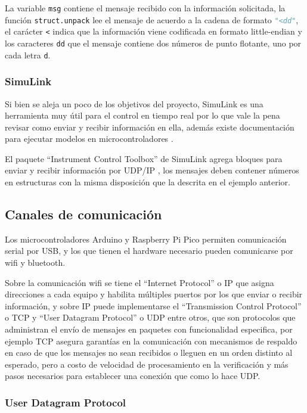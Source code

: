 La variable \lstinline{msg} contiene el mensaje recibido con la información solicitada, la función \lstinline{struct.unpack} lee el mensaje de acuerdo a la cadena de formato \lstinline[language=Python]{"<dd"}, el carácter \lstinline{<} indica que la información viene codificada en formato little-endian y los caracteres \lstinline{dd} que el mensaje contiene dos números de punto flotante, uno por cada letra \lstinline{d}.

\subsubsection{SimuLink}

Si bien se aleja un poco de los objetivos del proyecto, SimuLink es una herramienta muy útil para el control en tiempo real por lo que vale la pena revisar como enviar y recibir información en ella, además existe documentación para ejecutar modelos en microcontroladores \cite{simulinkarduino}.

El paquete ``Instrument Control Toolbox'' de SimuLink agrega bloques para enviar y recibir información por UDP/IP \cite{simulinkict}, los mensajes deben contener números en estructuras con la misma disposición que la descrita en el ejemplo anterior.

\subsection{Canales de comunicación}

Los microcontroladores Arduino y Raspberry Pi Pico permiten comunicación serial por USB, y los que tienen el hardware necesario pueden comunicarse por wifi y bluetooth.

Sobre la comunicación wifi se tiene el ``Internet Protocol'' o IP que asigna direcciones a cada equipo y habilita múltiples puertos por los que enviar o recibir información, y sobre IP puede implementarse el ``Transmission Control Protocol'' o TCP y ``User Datagram Protocol'' o UDP entre otros, que son protocolos que administran el envío de mensajes en paquetes con funcionalidad especifica, por ejemplo TCP asegura garantías en la comunicación con mecanismos de respaldo en caso de que los mensajes no sean recibidos o lleguen en un orden distinto al esperado, pero a costo de velocidad de procesamiento en la verificación y más pasos necesarios para establecer una conexión que como lo hace UDP.

\subsubsection{User Datagram Protocol}

